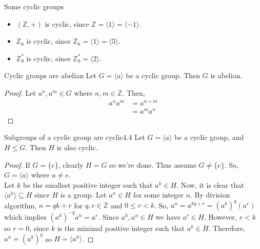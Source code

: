 \documentclass[12pt]{article}
\newcommand{\Z}{\mathbb{Z}}
\begin{document}
	\begin{myex}{Some cyclic groups}{}
		\begin{itemize}
			\item $(\Z, +)$ is cyclic, since $\Z=\langle 1\rangle=\langle -1\rangle$.
			\item $\Z_6$ is cyclic, since $\Z_6=\langle 1\rangle=\langle 5\rangle$.
			\item $\Z_9^*$ is cyclic, since $\Z_9^*=\langle 2\rangle$.
		\end{itemize}
	\end{myex}
	
	\begin{myprop}{Cyclic groups are abelian}{}
		Let $G=\langle a\rangle$ be a cyclic group. Then $G$ is abelian.
		\begin{proof}
			Let $a^n, a^m\in G$ where $n, m\in\Z$. Then,
			\begin{align*}
				a^na^m&=a^{n+m}\\
				&=a^ma^n
			\end{align*}
		\end{proof}
	\end{myprop}
	
	\begin{myprop}{Subgroups of a cyclic group are cyclic}{4.4}
		Let $G=\langle a\rangle$ be a cyclic group, and $H\leq G$. Then $H$ is also cyclic.
		\begin{proof}
			If $G=\{e\}$, clearly $H=G$ so we're done. Thus assume $G\neq\{e\}$. So, $G=\langle a\rangle$ where $a\neq e$.\\
			
			Let $k$ be the smallest positive integer such that $a^k\in H$. Now, it is clear that $\langle a^k\rangle\subseteq H$ since $H$ is a group. Let $a^n\in H$ for some integer $n$. By division algorithm, $n=qk+r$ for $q, r\in\Z$ and $0\leq r<k$. So, $a^n=a^{kq+r}=(a^k)^q(a^r)$ which implies $(a^k)^{-q}a^n=a^r$. Since $a^k, a^n\in H$ we have $a^r\in H$. However, $r<k$ so $r=0$, since $k$ is the minimal positive integer such that $a^k\in H$. Therefore, $a^n=(a^k)^q$ so $H=\langle a^k\rangle$.
		\end{proof}
	\end{myprop}
	
\end{document}
